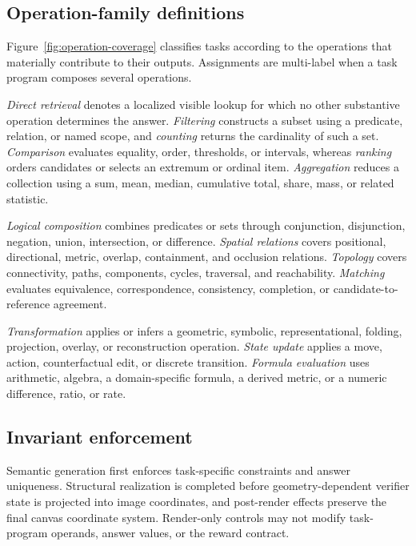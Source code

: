 \subsection{Operation-family definitions}
\label{app:operation-families}

Figure~\ref{fig:operation-coverage} classifies tasks according to the
operations that materially contribute to their outputs. Assignments are
multi-label when a task program composes several operations.

\textit{Direct retrieval} denotes a localized visible lookup for which no
other substantive operation determines the answer. \textit{Filtering}
constructs a subset using a predicate, relation, or named scope, and
\textit{counting} returns the cardinality of such a set. \textit{Comparison}
evaluates equality, order, thresholds, or intervals, whereas \textit{ranking}
orders candidates or selects an extremum or ordinal item.
\textit{Aggregation} reduces a collection using a sum, mean, median,
cumulative total, share, mass, or related statistic.

\textit{Logical composition} combines predicates or sets through conjunction,
disjunction, negation, union, intersection, or difference.
\textit{Spatial relations} covers positional, directional, metric, overlap,
containment, and occlusion relations. \textit{Topology} covers connectivity,
paths, components, cycles, traversal, and reachability.
\textit{Matching} evaluates equivalence, correspondence, consistency,
completion, or candidate-to-reference agreement.

\textit{Transformation} applies or infers a geometric, symbolic,
representational, folding, projection, overlay, or reconstruction operation.
\textit{State update} applies a move, action, counterfactual edit, or discrete
transition. \textit{Formula evaluation} uses arithmetic, algebra, a
domain-specific formula, a derived metric, or a numeric difference, ratio, or
rate.

\subsection{Invariant enforcement}

Semantic generation first enforces task-specific constraints and answer
uniqueness. Structural realization is completed before geometry-dependent
verifier state is projected into image coordinates, and post-render effects
preserve the final canvas coordinate system. Render-only controls may not
modify task-program operands, answer values, or the reward contract.

